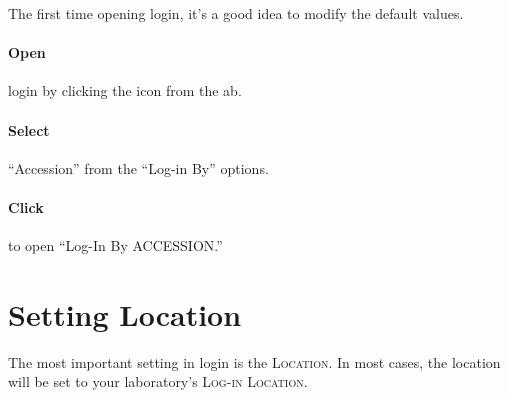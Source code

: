 The first time opening \gls{login}, it's a good idea to modify the default values.

\paragraph{Open} \gls{login} by clicking the  icon from the \gls{ab}.

\paragraph{Select} ``Accession'' from the  ``Log-in By'' options.
\paragraph{Click}  to open ``Log-In By ACCESSION.''\\

\section{Setting Location}
The most important setting in \gls{login}  is the \textsc{Location}. In most cases, the location will be set to your laboratory's \textsc{Log-in Location}.\\

